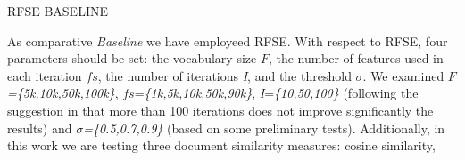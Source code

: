 \documentclass[runningheads]{llncs}
\begin{document}
RFSE BASELINE
%
%

As comparative \textit{Baseline} we have employeed RFSE. With respect to RFSE, four parameters should be set: the vocabulary size $F$, the number of features used in each iteration $fs$, the number of iterations \textit{I}, and the threshold $\sigma$. We examined $F$\textit{=\{5k,10k,50k,100k\}}, $fs$=\textit{\{1k,5k,10k,50k,90k\}}, \textit{I}=\textit{\{10,50,100\}} (following the suggestion in \citep{koppel2011authorship} that more than 100 iterations does not improve significantly the results) and $\sigma$\textit{=\{0.5,0.7,0.9\}} (based on some preliminary tests). Additionally, in this work we are testing three document similarity measures: cosine similarity,
\end{document}
